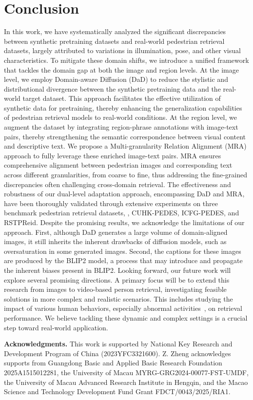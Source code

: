 \section{Conclusion}
\noindent In this work, we have systematically analyzed the significant discrepancies between synthetic pretraining datasets and real-world pedestrian retrieval datasets, largely attributed to variations in illumination, pose, and other visual characteristics. 
To mitigate these domain shifts, we introduce a unified framework that tackles the domain gap at both the image and region levels. At the image level, we employ Domain-aware Diffusion (DaD) to reduce the stylistic and distributional divergence between the synthetic pretraining data and the real-world target dataset. This approach facilitates the effective utilization of synthetic data for pretraining, thereby enhancing the generalization capabilities of pedestrian retrieval models to real-world conditions.
At the region level, we augment the dataset by integrating region-phrase annotations with image-text pairs, thereby strengthening the semantic correspondence between visual content and descriptive text. We propose a Multi-granularity Relation Alignment (MRA) approach to fully leverage these enriched image-text pairs. MRA ensures comprehensive alignment between pedestrian images and corresponding text across different granularities, from coarse to fine, thus addressing the fine-grained discrepancies often challenging cross-domain retrieval.
The effectiveness and robustness of our dual-level adaptation approach, encompassing DaD and MRA, have been thoroughly validated through extensive experiments on three benchmark pedestrian retrieval datasets, \ie, CUHK-PEDES, ICFG-PEDES, and RSTPReid. 
Despite the promising results, we acknowledge the limitations of our approach. First, although DaD generates a large volume of domain-aligned images, it still inherits the inherent drawbacks of diffusion models, such as oversaturation in some generated images. Second, the captions for these images are produced by the BLIP2 model, a process that may introduce and propagate the inherent biases present in BLIP2.
Looking forward, our future work will explore several promising directions. A primary focus will be to extend this research from images to video-based person retrieval, investigating feasible solutions in more complex and realistic scenarios. This includes studying the impact of various human behaviors, especially abnormal activities~\cite{yang2025beyond}, on retrieval performance. We believe tackling these dynamic and complex settings is a crucial step toward real-world application.


\noindent\textbf{Acknowledgments.}
This work is supported by National Key Research and Development Program of China (2023YFC3321600).
Z. Zheng acknowledges supports from Guangdong Basic and Applied Basic Research Foundation 2025A1515012281, the University of Macau MYRG-GRG2024-00077-FST-UMDF, the University of Macau Advanced Research Institute in Hengqin, and the Macao Science and Technology Development Fund Grant FDCT/0043/2025/RIA1.

